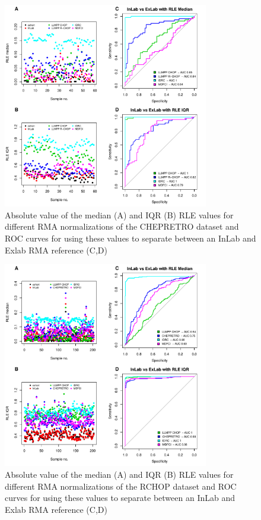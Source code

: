 \begin{figure}[!h]
	\begin{center}
		\includegraphics[width=0.8\textwidth]{figures/chep_rle.pdf}
	\end{center}
	\caption{Absolute value of the median (A) and IQR (B) RLE values for different RMA normalizations of the CHEPRETRO dataset and ROC curves for using these values to separate between an InLab and Exlab RMA reference (C,D)}
	\label{fig:chep_rle}
\end{figure}

\begin{figure}[!h]
	\begin{center}
		\includegraphics[width=0.8\textwidth]{figures/RCHOP_rle.pdf}
	\end{center}
	\caption{Absolute value of the median (A) and IQR (B) RLE values for different RMA normalizations of the RCHOP dataset and ROC curves for using these values to separate between an InLab and Exlab RMA reference (C,D)}
	\label{fig:rchop_rle}
\end{figure}

